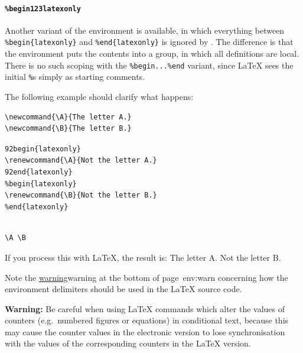 \paragraph*{\texttt{\%begin\char123latexonly}\label{unlatexonly}}
Another variant of the  environment is available, 
in which everything between 
\texttt{\%begin\{latexonly\}} and \texttt{\%end\{latexonly\}}
is ignored by \latextohtml.  
The difference is that the  environment 
puts the contents into a group, in which all definitions are local.
There is no such scoping with the \texttt{\%begin...\%end} variant,
since \LaTeX{} sees the initial \texttt{\%}s simply as starting comments.%

\medskip
{}\html{\\}\noindent
The following example should clarify what happens:
\begin{small}
\begin{verbatim}
\newcommand{\A}{The letter A.}
\newcommand{\B}{The letter B.}
\end{verbatim}
\indent\indent\indent\texttt{\char92begin\{latexonly\}}\\
\indent\indent\verb|\renewcommand{\A}{Not the letter A.}|\\
\indent\indent\texttt{\char92end\{latexonly\}}\\
\indent\indent\texttt{\%begin\{latexonly\}}\\
\indent\indent\verb|\renewcommand{\B}{Not the letter B.}|\\
\indent\indent\texttt{\%end\{latexonly\}}
\begin{verbatim}

\A \B

\end{verbatim}
\end{small}
If you process this with \LaTeX, the result is: 
\quad\quad The letter A. Not the letter B.

\smallskip\noindent
Note the \hyperref[page]{warning}{warning at the bottom of page~}{}{env:warn}
concerning how the environment delimiters should be used in the
\LaTeX{} source code.

\medskip{}\html{\\}\noindent
\textbf{Warning: }%
Be careful when using \LaTeX{}  commands which alter the values of counters 
(e.g.\ numbered figures or equations) in conditional text, because this may 
cause the counter values in the electronic version to lose synchronisation 
with the values of the corresponding counters in the \LaTeX{} version.


